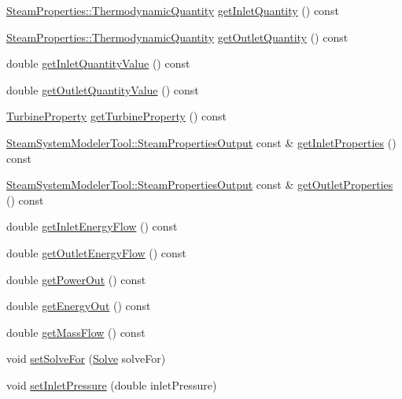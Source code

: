 \begin{DoxyCompactItemize}
\hyperlink{class_steam_properties_ae0294bedf7d178c2d8fb6aed0f62fbff}{Steam\+Properties\+::\+Thermodynamic\+Quantity} \hyperlink{class_turbine_ac9e91d9539cea5cd1e0037c397c28c78}{get\+Inlet\+Quantity} () const
\item 
\hyperlink{class_steam_properties_ae0294bedf7d178c2d8fb6aed0f62fbff}{Steam\+Properties\+::\+Thermodynamic\+Quantity} \hyperlink{class_turbine_acd3e98ab67754b652de97498d9bec6d2}{get\+Outlet\+Quantity} () const
\item 
double \hyperlink{class_turbine_a3d8a3f317fa71abb3404144371615725}{get\+Inlet\+Quantity\+Value} () const
\item 
double \hyperlink{class_turbine_aca98f128213e02e95dfd6f4b2ad8de4e}{get\+Outlet\+Quantity\+Value} () const
\item 
\hyperlink{class_turbine_a5db4f65cf2539e3837684d53221ade12}{Turbine\+Property} \hyperlink{class_turbine_a14f6eff49b501aa8c5a22d404dbeaac0}{get\+Turbine\+Property} () const
\item 
\hyperlink{struct_steam_system_modeler_tool_1_1_steam_properties_output}{Steam\+System\+Modeler\+Tool\+::\+Steam\+Properties\+Output} const  \& \hyperlink{class_turbine_a7a906cf74affed9acfa4045964eccbf6}{get\+Inlet\+Properties} () const
\item 
\hyperlink{struct_steam_system_modeler_tool_1_1_steam_properties_output}{Steam\+System\+Modeler\+Tool\+::\+Steam\+Properties\+Output} const  \& \hyperlink{class_turbine_aa9449622449e78285a258823ff77c8ec}{get\+Outlet\+Properties} () const
\item 
double \hyperlink{class_turbine_ae5d55a7b882e4780d490d43409f8f06c}{get\+Inlet\+Energy\+Flow} () const
\item 
double \hyperlink{class_turbine_aa20c0f9dd81cd9bfd5eda77f588516b5}{get\+Outlet\+Energy\+Flow} () const
\item 
double \hyperlink{class_turbine_a89585cc2fbfdbe67d539eae08c369fa2}{get\+Power\+Out} () const
\item 
double \hyperlink{class_turbine_a143fc660274e0d65ccb8fc55cc2caf83}{get\+Energy\+Out} () const
\item 
double \hyperlink{class_turbine_a4893a203dbbf9db9ca77a0b278c4c118}{get\+Mass\+Flow} () const
\item 
void \hyperlink{class_turbine_a96f54a8fc572dae6c5298289de890f4d}{set\+Solve\+For} (\hyperlink{class_turbine_a9fd7beba6c6f071e228fbe3e07969d2b}{Solve} solve\+For)
\item 
void \hyperlink{class_turbine_a04996baab9a40d449a69c737c00be8e4}{set\+Inlet\+Pressure} (double inlet\+Pressure)

\end{DoxyCompactItemize}
